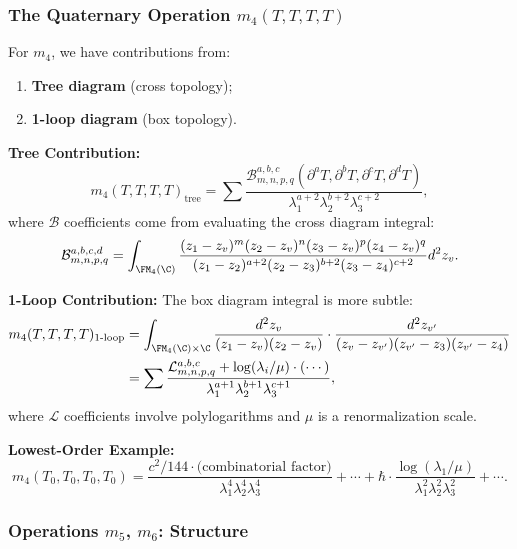\subsubsection{The Quaternary Operation $m_4(T,T,T,T)$}

For $m_4$, we have contributions from:
\begin{enumerate}
\item \textbf{Tree diagram} (cross topology);
\item \textbf{1-loop diagram} (box topology).
\end{enumerate}

\textbf{Tree Contribution:}
\begin{equation}
m_4(T,T,T,T)_{\text{tree}} = \sum \frac{\mathcal{B}^{a,b,c}_{m,n,p,q}(\partial^a T, \partial^b T, \partial^c T, \partial^d T)}{\lambda_1^{a+2} \lambda_2^{b+2} \lambda_3^{c+2}},
\end{equation}
where $\mathcal{B}$ coefficients come from evaluating the cross diagram integral:
\begin{equation}
\mathcal{B}^{a,b,c,d}_{m,n,p,q} = \int_{\FM_4(\C)} \frac{(z_1-z_v)^m (z_2-z_v)^n (z_3-z_v)^p (z_4-z_v)^q}{(z_1-z_2)^{a+2} (z_2-z_3)^{b+2} (z_3-z_4)^{c+2}} d^2z_v.
\end{equation}

\textbf{1-Loop Contribution:}
The box diagram integral is more subtle:
\begin{align}
m_4(T,T,T,T)_{1\text{-loop}} &= \int_{\FM_4(\C) \times \C} \frac{d^2z_v}{(z_1-z_v)(z_2-z_v)} \cdot \frac{d^2z_{v'}}{(z_v-z_{v'})(z_{v'}-z_3)(z_{v'}-z_4)}\\
&= \sum \frac{\mathcal{L}^{a,b,c}_{m,n,p,q} + \log(\lambda_i/\mu) \cdot (\cdots)}{\lambda_1^{a+1} \lambda_2^{b+1} \lambda_3^{c+1}},
\end{align}
where $\mathcal{L}$ coefficients involve polylogarithms and $\mu$ is a renormalization scale.

\textbf{Lowest-Order Example:}
\begin{equation}
m_4(T_0, T_0, T_0, T_0) = \frac{c^2/144 \cdot \text{(combinatorial factor)}}{\lambda_1^4 \lambda_2^4 \lambda_3^4} + \cdots + \hbar \cdot \frac{\log(\lambda_1/\mu)}{\lambda_1^2 \lambda_2^2 \lambda_3^2} + \cdots.
\end{equation}

\subsubsection{Operations $m_5$, $m_6$: Structure}

